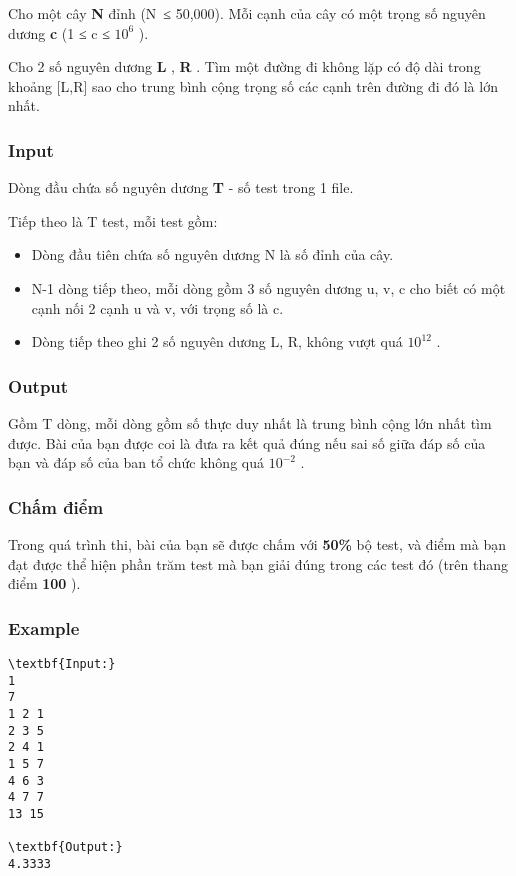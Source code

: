 



   Cho một cây   \textbf{    N   }   đỉnh (N ≤ 50,000). Mỗi cạnh của cây có một trọng số nguyên dương   \textbf{    c   }   (1 ≤ c ≤ $10^{6}$   ).  

   Cho 2 số nguyên dương   \textbf{    L   }   ,   \textbf{    R   }   . Tìm một đường đi không lặp có độ dài trong khoảng [L,R] sao cho trung bình cộng trọng số các cạnh trên đường đi đó là lớn nhất.  

\subsubsection{   Input  }

   Dòng đầu chứa số nguyên dương   \textbf{    T   }   - số test trong 1 file.  

   Tiếp theo là T test, mỗi test gồm:  
\begin{itemize}
	\item     Dòng đầu tiên chứa số nguyên dương N là số đỉnh của cây.   
	\item     N-1 dòng tiếp theo, mỗi dòng gồm 3 số nguyên dương u, v, c cho biết có một cạnh nối 2 cạnh u và v, với trọng số là c.   
	\item     Dòng tiếp theo ghi 2 số nguyên dương L, R, không vượt quá $10^{12}$    .   
\end{itemize}

\subsubsection{   Output  }

   Gồm T dòng, mỗi dòng gồm số thực duy nhất là trung bình cộng lớn nhất tìm được. Bài của bạn được coi là đưa ra kết quả đúng nếu sai số giữa đáp số của bạn và đáp số của ban tổ chức không quá $10^{-2}$   .  

\subsubsection{   Chấm điểm  }

   Trong quá trình thi, bài của bạn sẽ được chấm với   \textbf{    50\%   }   bộ test, và điểm mà bạn đạt được thể hiện phần trăm test mà bạn giải đúng trong các test đó (trên thang điểm   \textbf{    100   }   ).  

\subsubsection{   Example  }
\begin{verbatim}
\textbf{Input:}
1
7
1 2 1
2 3 5
2 4 1
1 5 7
4 6 3
4 7 7
13 15

\textbf{Output:}
4.3333

\end{verbatim}
